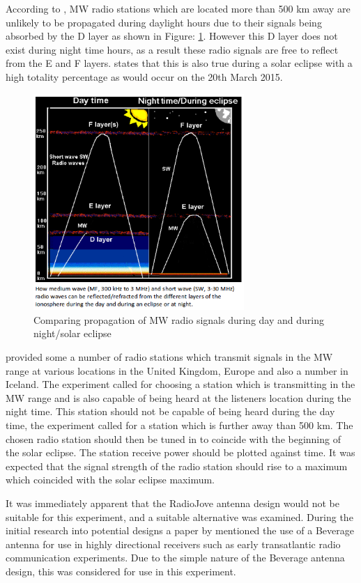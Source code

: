 \documentclass[runningheads,a4paper]{llncs}
\begin{document}
According to \cite{nichols-15-a}, \gls{MW} radio stations which are located more than 500 km away are unlikely to be propagated during daylight hours due to their signals being absorbed by the D layer as shown in Figure: \ref{fig:atmosphere_ionisation_effects_mw}. However this D layer does not exist during night time hours, as a result these radio signals are free to reflect from the E and F layers. \cite{RSGB-15-b} states that this is also true during a solar eclipse with a high totality percentage as would occur on the 20th March 2015.

%
\begin{figure}[!htb]
	\centering
	\includegraphics[width=8cm]{images/53}
	\caption{Comparing propagation of \gls{MW} radio signals during day and during night/solar eclipse \citep{RSGB-15-b}}
	\label{fig:atmosphere_ionisation_effects_mw}
\end{figure}
%

\cite{RSGB-15-b} provided some a number of radio stations which transmit signals in the \gls{MW} range at various locations in the United Kingdom, Europe and also a number in Iceland. The experiment called for choosing a station which is transmitting in the \gls{MW} range and is also capable of being heard at the listeners location during the night time. This station should not be capable of being heard during the day time, the experiment called for a station which is further away than 500 km. The chosen radio station should then be tuned in to coincide with the beginning of the solar eclipse. The station receive power should be plotted against time. It was expected that the signal strength of the radio station should rise to a maximum which coincided with the solar eclipse maximum.

It was immediately apparent that the RadioJove antenna design would not be suitable for this experiment, and a suitable alternative was examined. During the initial research into potential designs a paper by \cite{litva-76} mentioned the use of a Beverage antenna for use in highly directional receivers such as early transatlantic radio communication experiments. Due to the simple nature of the Beverage antenna design, this was considered for use in this experiment.
\end{document}
